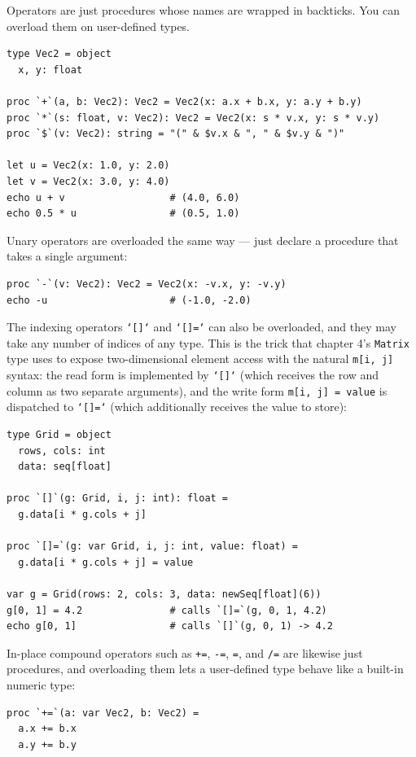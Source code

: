 \documentclass[justified, sixbynine]{tufte-book}
\def\ft{\small\tt}
\theoremstyle{plain}%
\newtheorem * {corollary}{Corollary}
\theoremstyle{definition}
\theoremstyle{remark}
\newtheorem * {remark}{Remark}
\newtheorem * {note}{Note}
\begin{document}
\begin{fullwidth}

Operators are just procedures whose names are wrapped in backticks. You can overload them on user-defined types.

\begin{lstlisting}
type Vec2 = object
  x, y: float

proc `+`(a, b: Vec2): Vec2 = Vec2(x: a.x + b.x, y: a.y + b.y)
proc `*`(s: float, v: Vec2): Vec2 = Vec2(x: s * v.x, y: s * v.y)
proc `$`(v: Vec2): string = "(" & $v.x & ", " & $v.y & ")"

let u = Vec2(x: 1.0, y: 2.0)
let v = Vec2(x: 3.0, y: 4.0)
echo u + v                  # (4.0, 6.0)
echo 0.5 * u                # (0.5, 1.0)
\end{lstlisting}

Unary operators are overloaded the same way --- just declare a procedure that takes a single argument:
\begin{lstlisting}
proc `-`(v: Vec2): Vec2 = Vec2(x: -v.x, y: -v.y)
echo -u                     # (-1.0, -2.0)
\end{lstlisting}

The indexing operators {\ft `[]`} and {\ft `[]=`} can also be overloaded, and they may take any number of indices of any type. This is the trick that chapter 4's {\ft Matrix} type uses to expose two-dimensional element access with the natural {\ft m[i, j]} syntax: the read form is implemented by {\ft `[]`} (which receives the row and column as two separate arguments), and the write form {\ft m[i, j] = value} is dispatched to {\ft `[]=`} (which additionally receives the value to store):
\begin{lstlisting}
type Grid = object
  rows, cols: int
  data: seq[float]

proc `[]`(g: Grid, i, j: int): float =
  g.data[i * g.cols + j]

proc `[]=`(g: var Grid, i, j: int, value: float) =
  g.data[i * g.cols + j] = value

var g = Grid(rows: 2, cols: 3, data: newSeq[float](6))
g[0, 1] = 4.2               # calls `[]=`(g, 0, 1, 4.2)
echo g[0, 1]                # calls `[]`(g, 0, 1) -> 4.2
\end{lstlisting}

In-place compound operators such as {\ft +=}, {\ft -=}, {\ft *=}, and {\ft /=} are likewise just procedures, and overloading them lets a user-defined type behave like a built-in numeric type:
\begin{lstlisting}
proc `+=`(a: var Vec2, b: Vec2) =
  a.x += b.x
  a.y += b.y


\end{lstlisting}
\end{fullwidth}
\end{document}
